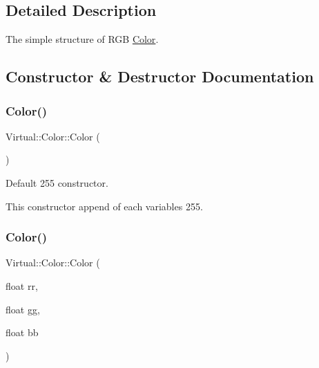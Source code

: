 \subsection{Detailed Description}
The simple structure of R\+GB \hyperlink{struct_virtual_1_1_color}{Color}. 

\subsection{Constructor \& Destructor Documentation}
\hypertarget{struct_virtual_1_1_color_a003277f5a30952ecccedbb61ad347ddc}{}\label{struct_virtual_1_1_color_a003277f5a30952ecccedbb61ad347ddc} 
\subsubsection{\texorpdfstring{Color()}{Color()}\hspace{0.1cm}{\footnotesize\ttfamily [1/2]}}
{\footnotesize\ttfamily Virtual\+::\+Color\+::\+Color (\begin{DoxyParamCaption}{ }\end{DoxyParamCaption})\hspace{0.3cm}{\ttfamily [inline]}}



Default 255 constructor. 

This constructor append of each variables 255. \hypertarget{struct_virtual_1_1_color_a04237a9e45fdf6378288d5b93573ace7}{}\label{struct_virtual_1_1_color_a04237a9e45fdf6378288d5b93573ace7} 
\subsubsection{\texorpdfstring{Color()}{Color()}\hspace{0.1cm}{\footnotesize\ttfamily [2/2]}}
{\footnotesize\ttfamily Virtual\+::\+Color\+::\+Color (\begin{DoxyParamCaption}\item[{float}]{rr,  }\item[{float}]{gg,  }\item[{float}]{bb }\end{DoxyParamCaption})\hspace{0.3cm}{\ttfamily [inline]}}



